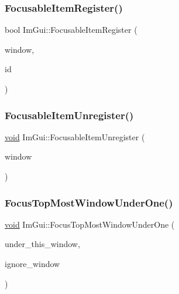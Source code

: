 \mbox{\label{namespaceImGui_a4fe31fef9fbc282addb6b7c6bff057c1}} 
\subsubsection{\texorpdfstring{Focusable\+Item\+Register()}{FocusableItemRegister()}}
{\footnotesize\ttfamily bool Im\+Gui\+::\+Focusable\+Item\+Register (\begin{DoxyParamCaption}\item[{\hyperlink{structImGuiWindow}{Im\+Gui\+Window} $\ast$}]{window,  }\item[{Im\+Gui\+ID}]{id }\end{DoxyParamCaption})\hspace{0.3cm}{\ttfamily [inline]}}

\mbox{\label{namespaceImGui_a390518fcaef04b4d399d2475d4d84df7}} 
\subsubsection{\texorpdfstring{Focusable\+Item\+Unregister()}{FocusableItemUnregister()}}
{\footnotesize\ttfamily \hyperlink{imgui__impl__opengl3__loader_8h_ac668e7cffd9e2e9cfee428b9b2f34fa7}{void} Im\+Gui\+::\+Focusable\+Item\+Unregister (\begin{DoxyParamCaption}\item[{\hyperlink{structImGuiWindow}{Im\+Gui\+Window} $\ast$}]{window }\end{DoxyParamCaption})\hspace{0.3cm}{\ttfamily [inline]}}

\mbox{\label{namespaceImGui_abc41033d9f60152a360017b292d5e9bc}} 
\subsubsection{\texorpdfstring{Focus\+Top\+Most\+Window\+Under\+One()}{FocusTopMostWindowUnderOne()}}
{\footnotesize\ttfamily \hyperlink{imgui__impl__opengl3__loader_8h_ac668e7cffd9e2e9cfee428b9b2f34fa7}{void} Im\+Gui\+::\+Focus\+Top\+Most\+Window\+Under\+One (\begin{DoxyParamCaption}\item[{\hyperlink{structImGuiWindow}{Im\+Gui\+Window} $\ast$}]{under\+\_\+this\+\_\+window,  }\item[{\hyperlink{structImGuiWindow}{Im\+Gui\+Window} $\ast$}]{ignore\+\_\+window }\end{DoxyParamCaption})}

